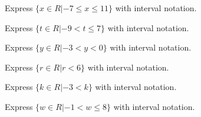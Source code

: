 \documentclass{ximera}
\begin{document}
\begin{exercise}
Express $ \{  x \in R | -7 \leq x \leq 11  \} $ with interval notation.

\begin{multipleChoice}
\choice[correct]{$[-7, 11]$}
\choice{$(-7, 11]$}
\choice{$[-7, 11)$}
\end{multipleChoice}

\end{exercise}







\begin{exercise}
Express $ \{  t \in R | -9 < t \leq 7  \} $ with interval notation. 

\begin{multipleChoice}
\choice{$[-9, 7]$}
\choice[correct]{$(-9, 7]$}
\choice{$[-9, 7)$}
\end{multipleChoice}

\end{exercise}








\begin{exercise}
Express $ \{  y \in R | -3 < y < 0  \} $ with interval notation.

\begin{multipleChoice}
\choice{$[-3, 0]$}
\choice{$(-3, 0]$}
\choice{$[-3, 0)$}
\end{multipleChoice}

\end{exercise}








\begin{exercise}
Express  $ \{  r \in R | r < 6  \} $ with interval notation.

\begin{multipleChoice}
\choice{$[-\infty, 6]$}
\choice{$[6, -\infty)$}
\end{multipleChoice}

\end{exercise}






\begin{exercise}
Express $ \{  k \in R | -3 < k  \} $ with interval notation.

\begin{multipleChoice}
\choice{$[-3, \infty]$}
\choice{$[-3, \infty)$}
\end{multipleChoice}

\end{exercise}





\begin{exercise}
Express $ \{  w \in R | -1 < w \leq 8  \} $ with interval notation.

\begin{multipleChoice}
\choice{$[-1, 8]$}
\choice{$[-1, 8)$}
\choice[correct]{$(-1, 8]$}
\end{multipleChoice}

\end{exercise}
\end{document}
